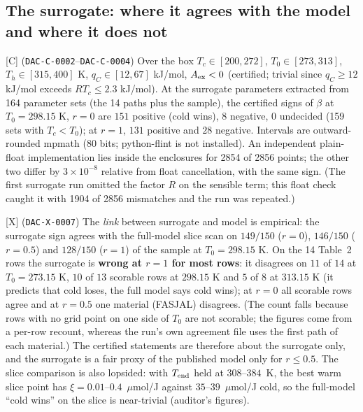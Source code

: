 \documentclass[10pt]{article}
\newcommand{\tier}[1]{\textsf{[#1]}}
\newcommand{\tC}{\tier{C}}
\newcommand{\tX}{\tier{X}}
\newcommand{\id}[1]{\texttt{DAC-#1}}
\newcommand{\umolJ}{\ensuremath{\mu}mol/J}
\begin{document}
\subsection{The surrogate: where it agrees with the model and where it does not}\label{sec:surr}
\tC{} (\id{C-0002}--\id{C-0004}) Over the box $T_c\in[200,272]$, $T_0\in[273,313]$, $T_h\in[315,400]$ K, $q_C\in[12,67]$ kJ/mol, $A_{\rm ex}<0$ (certified; trivial since $q_C\ge12$ kJ/mol exceeds $RT_c\le2.3$ kJ/mol). At the surrogate parameters extracted from 164 parameter sets (the 14 paths plus the sample), the certified signs of $\beta$
at $T_0=298.15$ K, $r=0$ are $151$ positive (cold wins), $8$ negative, $0$ undecided (159 sets with $T_c<T_0$); at $r=1$, $131$ positive and $28$ negative. Intervals are outward-rounded mpmath ($80$ bits; python-flint is not installed). An independent plain-float implementation lies inside the enclosures for 2854 of 2856 points; the other two differ by $3\times10^{-8}$ relative from
float cancellation, with the same sign. (The first surrogate run omitted the factor $R$ on the sensible term; this float check caught it with 1904 of 2856 mismatches and the run was repeated.)

\tX{} (\id{X-0007}) The \emph{link} between surrogate and model is empirical: the surrogate sign agrees with the full-model slice scan on $149/150$ ($r=0$), $146/150$ ($r=0.5$) and $128/150$ ($r=1$) of the sample at $T_0=298.15$ K. On the 14 Table~2 rows the surrogate is \textbf{wrong at $r=1$ for most rows}: it disagrees on $11$ of $14$ at $T_0=273.15$ K, $10$ of $13$ scorable
rows at $298.15$ K and $5$ of $8$ at $313.15$ K (it predicts that cold loses, the full model says cold wins); at $r=0$ all scorable rows agree and at $r=0.5$ one material (FASJAL) disagrees. (The count falls because rows with no grid point on one side of $T_0$ are not scorable; the figures come from a per-row recount, whereas the run's own agreement file uses the first path of each material.) The certified statements are therefore about the surrogate only, and the surrogate is a fair proxy of the published model only for $r\le0.5$. The slice comparison is also lopsided: with $T_{\rm end}$ held at $308$--$384$~K, the best warm slice point has $\xi=0.01$--$0.4$~\umolJ{} against $35$--$39$~\umolJ{} cold, so the full-model ``cold wins'' on the slice is near-trivial (auditor's figures).

\end{document}
